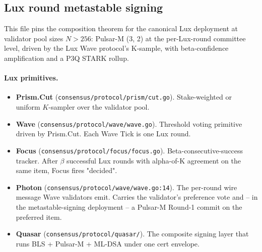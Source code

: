 
\subsection*{Lux round metastable signing}

This file pins the composition theorem for the canonical Lux
deployment at validator pool sizes $N > 256$: Pulsar-M (3, 2) at the
per-Lux-round committee level, driven by the Lux Wave protocol's
K-sample, with beta-confidence amplification and a P3Q STARK rollup.

\paragraph{Lux primitives.}
\begin{itemize}[leftmargin=*, itemsep=0pt]
\item \textbf{Prism.Cut}
(\texttt{consensus/protocol/prism/cut.go}). Stake-weighted or
uniform $K$-sampler over the validator pool.
\item \textbf{Wave} (\texttt{consensus/protocol/wave/wave.go}).
Threshold voting primitive driven by Prism.Cut. Each Wave Tick is
one Lux round.
\item \textbf{Focus} (\texttt{consensus/protocol/focus/focus.go}).
Beta-consecutive-success tracker. After $\beta$ successful Lux
rounds with alpha-of-K agreement on the same item, Focus fires
"decided".
\item \textbf{Photon} (\texttt{consensus/protocol/wave/wave.go:14}).
The per-round wire message Wave validators emit. Carries the
validator's preference vote and -- in the metastable-signing
deployment -- a Pulsar-M Round-1 commit on the preferred item.
\item \textbf{Quasar} (\texttt{consensus/protocol/quasar/}).
The composite signing layer that runs BLS + Pulsar-M + ML-DSA
under one cert envelope.
\end{itemize}

